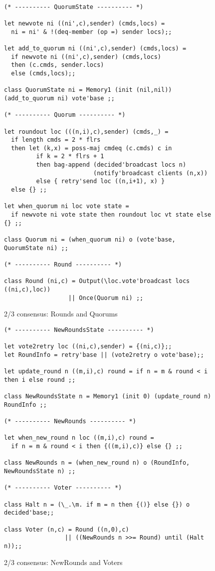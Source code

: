 \documentclass[final]{article}
\begin{document}

\begin{figure}[!t]
  \begin{lstlisting}[basicstyle=\small]

(* ---------- QuorumState ---------- *)

let newvote ni ((ni',c),sender) (cmds,locs) =
  ni = ni' & !(deq-member (op =) sender locs);;

let add_to_quorum ni ((ni',c),sender) (cmds,locs) =
  if newvote ni ((ni',c),sender) (cmds,locs)
  then (c.cmds, sender.locs)
  else (cmds,locs);;

class QuorumState ni = Memory1 (init (nil,nil)) (add_to_quorum ni) vote'base ;;

(* ---------- Quorum ---------- *)

let roundout loc (((n,i),c),sender) (cmds,_) =
  if length cmds = 2 * flrs
  then let (k,x) = poss-maj cmdeq (c.cmds) c in
         if k = 2 * flrs + 1
         then bag-append (decided'broadcast locs n)
                         (notify'broadcast clients (n,x))
         else { retry'send loc ((n,i+1), x) }
  else {} ;;

let when_quorum ni loc vote state =
  if newvote ni vote state then roundout loc vt state else {} ;;

class Quorum ni = (when_quorum ni) o (vote'base, QuorumState ni) ;;

(* ---------- Round ---------- *)

class Round (ni,c) = Output(\loc.vote'broadcast locs ((ni,c),loc))
                  || Once(Quorum ni) ;;
  \end{lstlisting}
  \caption{2/3 consensus: Rounds and Quorums}
  \label{fig:simple-consensus-quorum}
\end{figure}


\begin{figure}[!t]
  \begin{lstlisting}[basicstyle=\small]
(* ---------- NewRoundsState ---------- *)

let vote2retry loc ((ni,c),sender) = {(ni,c)};;
let RoundInfo = retry'base || (vote2retry o vote'base);;

let update_round n ((m,i),c) round = if n = m & round < i then i else round ;;

class NewRoundsState n = Memory1 (init 0) (update_round n) RoundInfo ;;

(* ---------- NewRounds ---------- *)

let when_new_round n loc ((m,i),c) round =
  if n = m & round < i then {((m,i),c)} else {} ;;

class NewRounds n = (when_new_round n) o (RoundInfo, NewRoundsState n) ;;

(* ---------- Voter ---------- *)

class Halt n = (\_.\m. if m = n then {()} else {}) o decided'base;;

class Voter (n,c) = Round ((n,0),c)
                 || ((NewRounds n >>= Round) until (Halt n));;
  \end{lstlisting}
  \caption{2/3 consensus: NewRounds and Voters}
  \label{fig:simple-consensus-voter}
\end{figure}
\end{document}
